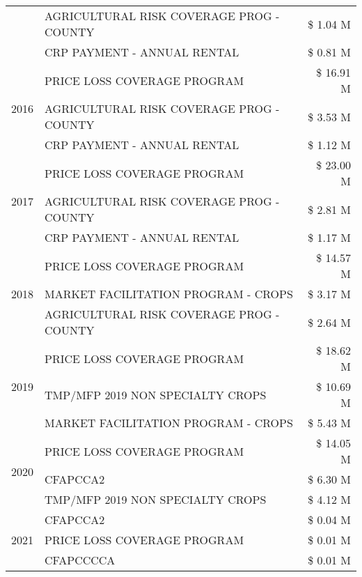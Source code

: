 \begin{tabular}{llr}
 & AGRICULTURAL RISK COVERAGE PROG - COUNTY & \$ 1.04 M \\
 & CRP PAYMENT - ANNUAL RENTAL & \$ 0.81 M \\
\cline{1-3}
\multirow[t]{3}{*}{2016} & PRICE LOSS COVERAGE PROGRAM                   & \$ 16.91 M \\
 & AGRICULTURAL RISK COVERAGE PROG - COUNTY      & \$ 3.53 M \\
 & CRP PAYMENT - ANNUAL RENTAL                   & \$ 1.12 M \\
\cline{1-3}
\multirow[t]{3}{*}{2017} & PRICE LOSS COVERAGE PROGRAM & \$ 23.00 M \\
 & AGRICULTURAL RISK COVERAGE PROG - COUNTY & \$ 2.81 M \\
 & CRP PAYMENT - ANNUAL RENTAL & \$ 1.17 M \\
\cline{1-3}
\multirow[t]{3}{*}{2018} & PRICE LOSS COVERAGE PROGRAM & \$ 14.57 M \\
 & MARKET FACILITATION PROGRAM - CROPS & \$ 3.17 M \\
 & AGRICULTURAL RISK COVERAGE PROG - COUNTY & \$ 2.64 M \\
\cline{1-3}
\multirow[t]{3}{*}{2019} & PRICE LOSS COVERAGE PROGRAM & \$ 18.62 M \\
 & TMP/MFP 2019 NON SPECIALTY CROPS & \$ 10.69 M \\
 & MARKET FACILITATION PROGRAM - CROPS & \$ 5.43 M \\
\cline{1-3}
\multirow[t]{3}{*}{2020} & PRICE LOSS COVERAGE PROGRAM & \$ 14.05 M \\
 & CFAPCCA2 & \$ 6.30 M \\
 & TMP/MFP 2019 NON SPECIALTY CROPS & \$ 4.12 M \\
\cline{1-3}
\multirow[t]{3}{*}{2021} & CFAPCCA2 & \$ 0.04 M \\
 & PRICE LOSS COVERAGE PROGRAM & \$ 0.01 M \\
 & CFAPCCCCA & \$ 0.01 M \\
\cline{1-3}
\bottomrule
\end{tabular}
